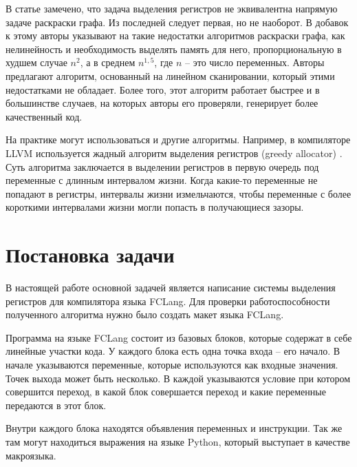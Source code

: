 \documentclass[a4paper,14pt]{extarticle}
\begin{document}
В статье \cite{krishnamurthi_extended_2007} замечено, что задача выделения регистров не эквивалентна напрямую задаче раскраски графа.
Из последней следует первая, но не наоборот.
В добавок к этому авторы указывают на такие недостатки алгоритмов раскраски графа,
как нелинейность и необходимость выделять память для него,
пропорциональную в худшем случае $n^2$, а в среднем $n^{1,5}$, где $n$ -- это число переменных.
Авторы предлагают алгоритм, основанный на линейном сканировании, который этими недостатками не обладает.
Более того, этот алгоритм работает быстрее и в большинстве случаев, на которых авторы его проверяли, генерирует более качественный код.

На практике могут использоваться и другие алгоритмы.
Например, в компиляторе LLVM используется жадный алгоритм выделения регистров (greedy allocator) \cite{llvm_greedy_2011}.
Суть алгоритма заключается в выделении регистров в первую очередь под переменные с длинным интервалом жизни.
Когда какие-то переменные не попадают в регистры, интервалы жизни измельчаются, чтобы переменные с более короткими интервалами жизни могли попасть в получающиеся зазоры.


\section{Постановка задачи}

В настоящей работе основной задачей является написание системы выделения регистров для компилятора языка FCLang.
Для проверки работоспособности полученного алгоритма нужно было создать макет языка FCLang.

Программа на языке FCLang состоит из базовых блоков, которые содержат в себе линейные участки кода.
У каждого блока есть одна точка входа -- его начало.
В начале указываются переменные, которые используются как входные значения.
Точек выхода может быть несколько.
В каждой указываются условие при котором совершится переход, в какой блок совершается переход и какие переменные передаются в этот блок.

Внутри каждого блока находятся объявления переменных и инструкции.
Так же там могут находиться выражения на языке Python, который выступает в качестве макроязыка.
%
\end{document}
